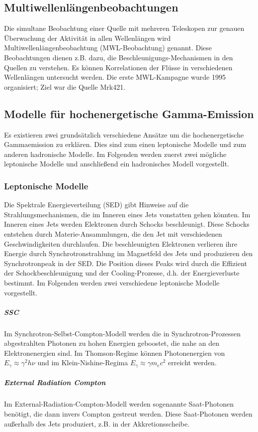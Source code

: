 \subsection{Multiwellenlängenbeobachtungen}
Die simultane Beobachtung einer Quelle mit mehreren Teleskopen zur genauen Überwachung der Aktivität in allen Wellenlängen wird Multiwellenlängenbeobachtung (MWL-Beobachtung) genannt. 
Diese Beobachtungen dienen z.B. dazu, die Beschleunigungs-Mechanismen in den Quellen zu verstehen.
Es können Korrelationen der Flüsse in verschiedenen Wellenlängen untersucht werden.
Die erste MWL-Kampagne wurde 1995 organisiert; Ziel war die Quelle Mrk421.\cite{Weekes}

\subsection{Modelle für hochenergetische Gamma-Emission}
Es existieren zwei grundsätzlich verschiedene Ansätze um die hochenergetische Gammaemission zu erklären.
Dies sind zum einen leptonische Modelle und zum anderen hadronische Modelle.
Im Folgenden werden zuerst zwei mögliche leptonische Modelle und anschließend ein hadronisches Modell vorgestellt.

\subsubsection{Leptonische Modelle}
Die Spektrale Energieverteilung (SED) gibt Hinweise auf die Strahlungsmechanismen, die im Inneren eines Jets vonstatten gehen könnten.
Im Inneren eines Jets werden Elektronen durch Schocks beschleunigt. 
Diese Schocks entstehen durch Materie-Ansammlungen, die den Jet mit verschiedenen Geschwindigkeiten durchlaufen.
Die beschleunigten Elektronen verlieren ihre Energie durch Synchrotronstrahlung im Magnetfeld des Jets und produzieren den Synchrotronpeak in der SED.
Die Position dieses Peaks wird durch die Effizient der Schockbeschleunigung und der Cooling-Prozesse, d.h. der Energieverluste bestimmt. 
Im Folgenden werden zwei verschiedene leptonische Modelle vorgestellt.\cite{Weekes}

\subparagraph{SSC}
Im Synchrotron-Selbst-Compton-Modell werden die in Synchrotron-Prozessen abgestrahlten Photonen zu hohen Energien geboostet, die nahe an den Elektronenergien sind.
Im Thomson-Regime können Photonenergien von $E_{\gamma}\approx \gamma^2 h \nu$ und im Klein-Nishine-Regima $E_{\gamma}\approx \gamma m_e c^2$ erreicht werden.\cite{Weekes}

\subparagraph{External Radiation Compton}
Im External-Radiation-Compton-Modell werden sogenannte Saat-Photonen benötigt, die dann invers Compton gestreut werden.
Diese Saat-Photonen werden außerhalb des Jets produziert, z.B. in der Akkretionsscheibe.\cite{Weekes}

